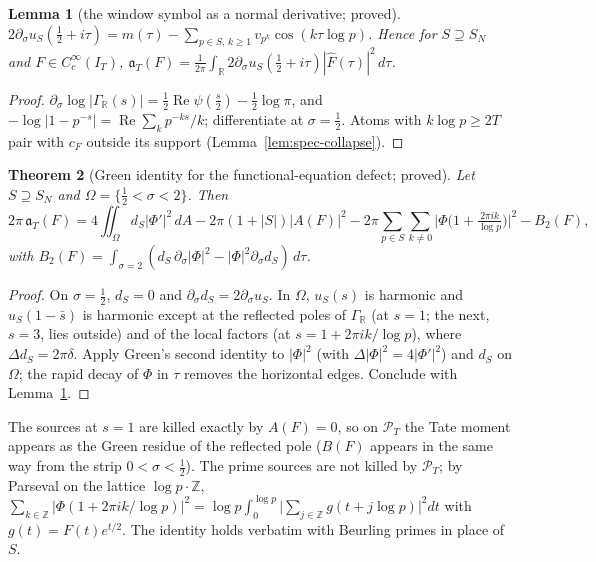 \documentclass[11pt]{amsart}
\newtheorem{theorem}{Theorem}[section]
\newtheorem{lemma}[theorem]{Lemma}
\theoremstyle{definition}
\theoremstyle{remark}
\newcommand{\R}{\mathbb R}
\newcommand{\Z}{\mathbb Z}
\newcommand{\Rel}{\operatorname{Re}}
\newcommand{\PT}{\mathcal P_T}
\newcommand{\IT}{I_T}
\newcommand{\Fh}{\widehat F}
\newcommand{\cF}{c_F}
\begin{document}
\begin{lemma}[the window symbol as a normal derivative; proved]\label{lem:strip-L1}
$2\partial_\sigma u_S(\frac12+i\tau)=m(\tau)-\sum_{p\in S,\,k\ge1}v_{p^k}\cos(k\tau\log p)$. Hence for $S\supseteq S_N$ and
$F\in C_c^\infty(\IT)$, $\mathfrak a_T(F)=\frac1{2\pi}\int_\R2\partial_\sigma u_S(\frac12+i\tau)|\Fh(\tau)|^2\,d\tau$.
\end{lemma}
\begin{proof}
$\partial_\sigma\log|\Gamma_\R(s)|=\frac12\Rel\psi(\frac s2)-\frac12\log\pi$, and $-\log|1-p^{-s}|=\Rel\sum_kp^{-ks}/k$; differentiate
at $\sigma=\frac12$. Atoms with $k\log p\ge2T$ pair with $\cF$ outside its support (Lemma~\ref{lem:spec-collapse}).
\end{proof}

\begin{theorem}[Green identity for the functional-equation defect; proved]\label{thm:strip-L3}
Let $S\supseteq S_N$ and $\Omega=\{\frac12<\sigma<2\}$. Then
\[
2\pi\,\mathfrak a_T(F)=4\iint_\Omega d_S|\Phi'|^2\,dA-2\pi(1+|S|)|A(F)|^2-2\pi\sum_{p\in S}\sum_{k\ne0}\Big|\Phi\big(1+\tfrac{2\pi ik}{\log p}\big)\Big|^2-B_2(F),
\]
with $B_2(F)=\int_{\sigma=2}(d_S\,\partial_\sigma|\Phi|^2-|\Phi|^2\partial_\sigma d_S)\,d\tau$.
\end{theorem}
\begin{proof}
On $\sigma=\frac12$, $d_S=0$ and $\partial_\sigma d_S=2\partial_\sigma u_S$. In $\Omega$, $u_S(s)$ is harmonic and $u_S(1-\bar s)$ is
harmonic except at the reflected poles of $\Gamma_\R$ (at $s=1$; the next, $s=3$, lies outside) and of the local factors (at
$s=1+2\pi ik/\log p$), where $\Delta d_S=2\pi\delta$. Apply Green's second identity to $|\Phi|^2$ (with $\Delta|\Phi|^2=4|\Phi'|^2$) and
$d_S$ on $\Omega$; the rapid decay of $\Phi$ in $\tau$ removes the horizontal edges. Conclude with Lemma~\ref{lem:strip-L1}.
\end{proof}
The sources at $s=1$ are killed exactly by $A(F)=0$, so on $\PT$ the Tate moment appears as the Green residue of the reflected pole
($B(F)$ appears in the same way from the strip $0<\sigma<\frac12$). The prime sources are not killed by $\PT$; by Parseval on the
lattice $\log p\cdot\Z$,
$\sum_{k\in\Z}|\Phi(1+2\pi ik/\log p)|^2=\log p\int_0^{\log p}\big|\sum_{j\in\Z}g(t+j\log p)\big|^2dt$ with $g(t)=F(t)e^{t/2}$.
The identity holds verbatim with Beurling primes in place of $S$.
\end{document}

